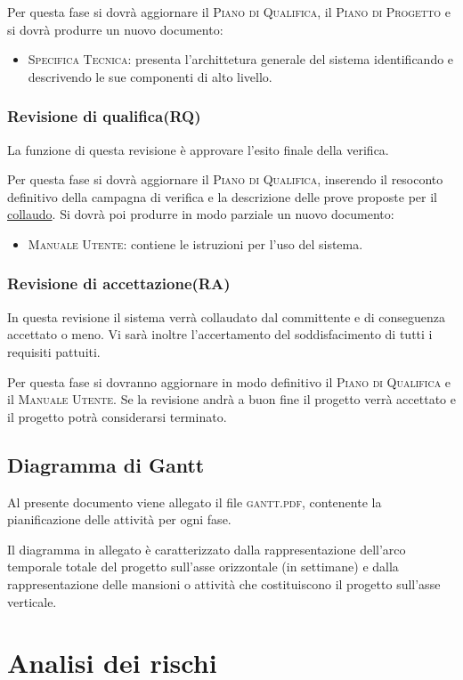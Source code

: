 \documentclass[11pt,a4paper]{article}
\begin{document}
Per questa fase si dovrà aggiornare il \textsc{Piano di Qualifica}, il \textsc{Piano di Progetto} e si dovrà produrre un nuovo documento:
\begin{itemize}
\item \textsc{Specifica Tecnica}: presenta l'archittetura generale del sistema identificando e descrivendo le sue componenti di alto livello.
\end{itemize}
\subsubsection{Revisione di qualifica(RQ)}
La funzione di questa revisione è approvare l'esito finale della verifica.

Per questa fase si dovrà aggiornare il \textsc{Piano di Qualifica}, inserendo il resoconto definitivo della campagna di verifica e la descrizione delle prove proposte per il \underline{collaudo}. Si dovrà poi produrre in modo parziale un nuovo documento:
\begin{itemize}
\item \textsc{Manuale Utente}: contiene le istruzioni per l'uso del sistema.
\end{itemize}
\subsubsection{Revisione di accettazione(RA)}
In questa revisione il sistema verrà collaudato dal committente e di conseguenza accettato o meno.
Vi sarà inoltre l'accertamento del soddisfacimento di tutti i requisiti pattuiti.

Per questa fase si dovranno aggiornare in modo definitivo il \textsc{Piano di Qualifica} e il \textsc{Manuale Utente}.
Se la revisione andrà a buon fine il progetto verrà accettato e il progetto potrà considerarsi terminato.
\subsection{Diagramma di Gantt}
Al presente documento viene allegato il file \textsc{gantt.pdf}, contenente la pianificazione delle attività per ogni fase.

Il diagramma in allegato è caratterizzato dalla rappresentazione dell'arco temporale totale del progetto sull'asse orizzontale (in settimane) e dalla rappresentazione delle mansioni o attività che costituiscono il progetto sull'asse verticale.
\section{Analisi dei rischi}
\end{document}
